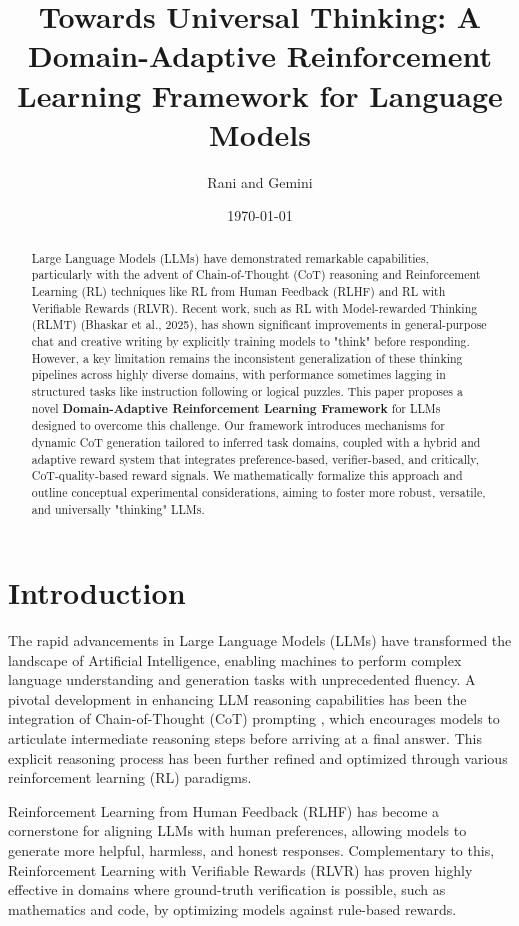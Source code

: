 \documentclass{article}
\title{Towards Universal Thinking: A Domain-Adaptive Reinforcement Learning Framework for Language Models}
\author{Rani and Gemini}
\date{\today}
\begin{document}
\maketitle

\begin{abstract}
Large Language Models (LLMs) have demonstrated remarkable capabilities, particularly with the advent of Chain-of-Thought (CoT) reasoning and Reinforcement Learning (RL) techniques like RL from Human Feedback (RLHF) and RL with Verifiable Rewards (RLVR). Recent work, such as RL with Model-rewarded Thinking (RLMT) (Bhaskar et al., 2025), has shown significant improvements in general-purpose chat and creative writing by explicitly training models to "think" before responding. However, a key limitation remains the inconsistent generalization of these thinking pipelines across highly diverse domains, with performance sometimes lagging in structured tasks like instruction following or logical puzzles. This paper proposes a novel \textbf{Domain-Adaptive Reinforcement Learning Framework} for LLMs designed to overcome this challenge. Our framework introduces mechanisms for dynamic CoT generation tailored to inferred task domains, coupled with a hybrid and adaptive reward system that integrates preference-based, verifier-based, and critically, CoT-quality-based reward signals. We mathematically formalize this approach and outline conceptual experimental considerations, aiming to foster more robust, versatile, and universally "thinking" LLMs.
\end{abstract}

\section{Introduction}
The rapid advancements in Large Language Models (LLMs) have transformed the landscape of Artificial Intelligence, enabling machines to perform complex language understanding and generation tasks with unprecedented fluency. A pivotal development in enhancing LLM reasoning capabilities has been the integration of Chain-of-Thought (CoT) prompting \cite{wei2022chain}, which encourages models to articulate intermediate reasoning steps before arriving at a final answer. This explicit reasoning process has been further refined and optimized through various reinforcement learning (RL) paradigms.

Reinforcement Learning from Human Feedback (RLHF) \cite{ouyang2022training} has become a cornerstone for aligning LLMs with human preferences, allowing models to generate more helpful, harmless, and honest responses. Complementary to this, Reinforcement Learning with Verifiable Rewards (RLVR) \cite{lambert2025tulu} has proven highly effective in domains where ground-truth verification is possible, such as mathematics and code, by optimizing models against rule-based rewards.
\end{document}
